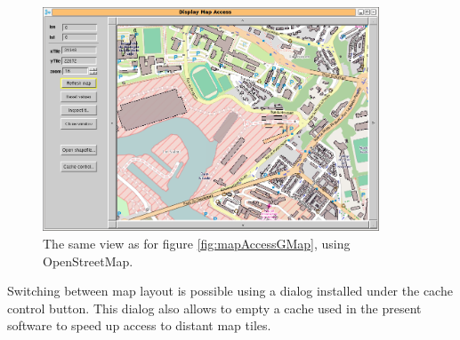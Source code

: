 \begin{figure}
\begin{center}
\includegraphics[width=10cm]{mapAccessPenfeldOSM.png}
\caption{The same view as for figure \ref{fig:mapAccessGMap}, using OpenStreetMap.}
\label{fig:mapAccessOSM}
\end{center}
\end{figure}

Switching between map layout is possible using a dialog installed 
under the cache control button. This dialog also allows to empty a cache 
used in the present software to speed up access to distant map tiles. 



